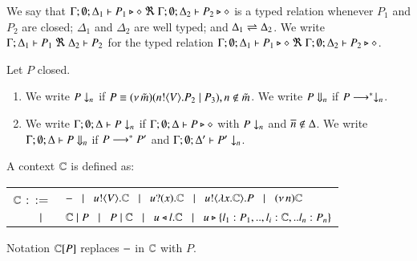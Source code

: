 \begin{definition}\rm
	We say that
	$\Gamma; \emptyset; \Delta_1 \vdash P_1 \triangleright \diamond\ \Re \ \Gamma; \emptyset; \Delta_2 \vdash P_2 \triangleright \diamond$
	is a typed relation whenever $P_1$ and $P_2$ are closed;
		$\Delta_1$ and $\Delta_2$ are well typed; and 
		$\Delta_1 \rightleftharpoons \Delta_2$.
We write
$\horel{\Gamma}{\Delta_1}{P_1}{\ \Re \ }{\Delta_2}{P_2}$
for the typed relation $\Gamma; \emptyset; \Delta_1 \vdash P_1 \triangleright \diamond\ \Re \ \Gamma; \emptyset; \Delta_2 \vdash P_2 \triangleright \diamond$.
\end{definition}


\begin{definition}[Barbs]\rm
	Let $P$ closed.
	\begin{enumerate}
		\item	We write $P \downarrow_{n}$ if $P \equiv (\nu\, \tilde{m})(n ! \langle V \rangle . P_2 \;|\; P_3), n \notin \tilde{m}$.
			We write $P \Downarrow_{n}$ if $P \longrightarrow^* \downarrow_{n}$.

		\item	We write $\Gamma; \emptyset; \Delta \vdash P \downarrow_{n}$ if
			$\Gamma; \emptyset; \Delta \vdash P \triangleright \diamond$ with $P \downarrow_{n}$ and $\overline{n} \notin \Delta$.
			We write $\Gamma; \emptyset; \Delta \vdash P \Downarrow_{n}$ if $P \longrightarrow^* P'$ and
			$\Gamma; \emptyset; \Delta' \vdash P' \downarrow_{n}$.			
	\end{enumerate}
\end{definition}

\begin{definition}[Context]\rm
	A context ${\Bbb C}$ is defined as:
	\begin{tabular}{rl}
	${\Bbb C}$ $::=$ & $- \;\;\;|\;\;\; u ! \langle V \rangle . {\Bbb C} \;\;\;|\;\;\; u ? (x) . {\Bbb C}
\;\;\;|\;\;\; u ! \langle \lambda x.{\Bbb C} \rangle . P
\;\;\;|\;\;\; (\nu\, n) {\Bbb C}$\\ 
             $\;\;\;|\;\;\;$ & ${\Bbb C} \;|\; P \;\;\;|\;\;\; P \;|\; {\Bbb C} 
\;\;\;|\;\;\; u \triangleleft l . {\Bbb C} \;\;\;|\;\;\; u \triangleright \{l_1:P_1,..,l_i:{\Bbb C},..l_n:P_n\}$
	\end{tabular}

	Notation ${\Bbb C}[P]$ replaces $-$ in ${\Bbb C}$ with $P$.
\end{definition}

